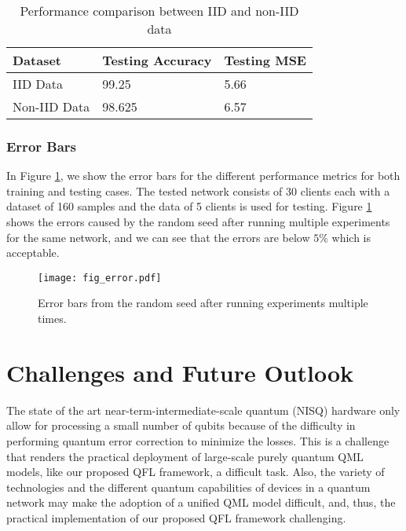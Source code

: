 \documentclass{article}
\begin{document}
\begin{table}%
  \caption{Performance comparison between IID and non-IID data}
  \label{non_iid}
  \centering
  \begin{tabular}{lll}
    \toprule
    Dataset     & Testing Accuracy     & Testing MSE \\
    \midrule
    IID Data & 99.25  & 5.66    \\
    Non-IID Data & 98.625 & 6.57     \\
    \bottomrule%
  \end{tabular}
\end{table}

\subsubsection{Error Bars}\label{subsec_error_bars}
In Figure \ref{fig_error}, we show the error bars for the different performance metrics for both training and testing cases. The tested network consists of 30 clients each with a dataset of 160 samples and the data of 5 clients is used for testing. Figure \ref{fig_error} shows the errors caused by the random seed after running multiple experiments for the same network, and we can see that the errors are below $5\%$ which is acceptable.   

\begin{figure}[ht]
  \begin{center}
    \texttt{[image: fig\_error.pdf]}
    \caption{Error bars from the random seed after running experiments multiple times.}\label{fig_error}
  \end{center}
\end{figure}


\section{Challenges and Future Outlook}
\label{future}%
The state of the art near-term-intermediate-scale quantum (NISQ) hardware only allow for processing a small number of qubits because of the difficulty in performing quantum error correction to minimize the losses. This is a challenge that renders the practical deployment of large-scale purely quantum QML models, like our proposed QFL framework, a difficult task. Also, the variety of technologies and the different quantum capabilities of devices in a quantum network may make the adoption of a unified QML model difficult, and, thus, the practical implementation of our proposed QFL framework challenging. 
\end{document}
